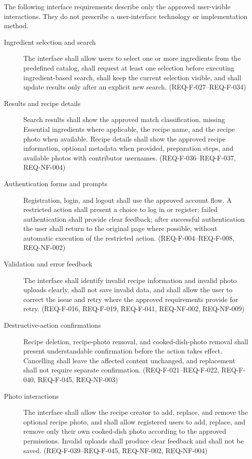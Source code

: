\documentclass[12pt]{article}
\begin{document}
The following interface requirements describe only the approved user-visible interactions. They do not prescribe a user-interface technology or implementation method.

\begin{description}
    \item[Ingredient selection and search] The interface shall allow users to select one or more ingredients from the predefined catalog, shall request at least one selection before executing ingredient-based search, shall keep the current selection visible, and shall update results only after an explicit new search. (REQ-F-027--REQ-F-034)
    \item[Results and recipe details] Search results shall show the approved match classification, missing Essential ingredients where applicable, the recipe name, and the recipe photo when available. Recipe details shall show the approved recipe information, optional metadata when provided, preparation steps, and available photos with contributor usernames. (REQ-F-036--REQ-F-037, REQ-NF-004)
    \item[Authentication forms and prompts] Registration, login, and logout shall use the approved account flow. A restricted action shall present a choice to log in or register; failed authentication shall provide clear feedback; after successful authentication the user shall return to the original page where possible, without automatic execution of the restricted action. (REQ-F-004--REQ-F-008, REQ-NF-002)
    \item[Validation and error feedback] The interface shall identify invalid recipe information and invalid photo uploads clearly, shall not save invalid data, and shall allow the user to correct the issue and retry where the approved requirements provide for retry. (REQ-F-016, REQ-F-019, REQ-F-041, REQ-NF-002, REQ-NF-009)
    \item[Destructive-action confirmations] Recipe deletion, recipe-photo removal, and cooked-dish-photo removal shall present understandable confirmation before the action takes effect. Cancelling shall leave the affected content unchanged, and replacement shall not require separate confirmation. (REQ-F-021--REQ-F-022, REQ-F-040, REQ-F-045, REQ-NF-003)
    \item[Photo interactions] The interface shall allow the recipe creator to add, replace, and remove the optional recipe photo, and shall allow registered users to add, replace, and remove only their own cooked-dish photo according to the approved permissions. Invalid uploads shall produce clear feedback and shall not be saved. (REQ-F-039--REQ-F-045, REQ-NF-002, REQ-NF-004)
\end{description}
\end{document}
